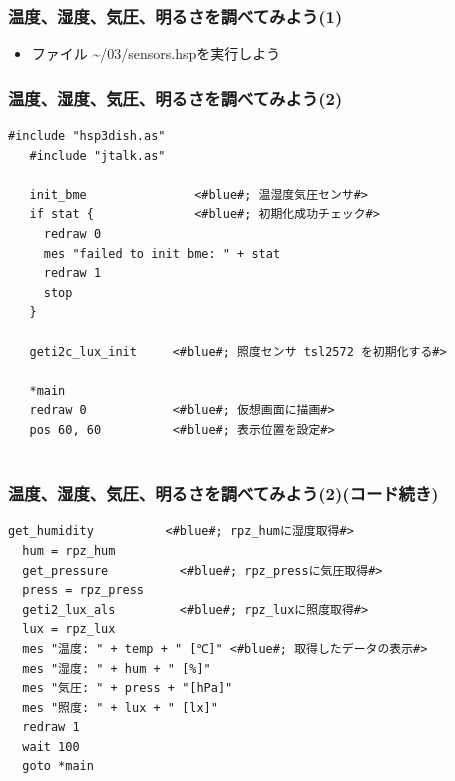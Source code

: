 

\begin{frame}
  \frametitle{温度、湿度、気圧、明るさを調べてみよう(1)}
  \begin{itemize}
    \item ファイル \rightarrow \sim/03/sensors.hspを実行しよう
  \end{itemize}
\end{frame}

\begin{frame}[fragile]
  \frametitle{温度、湿度、気圧、明るさを調べてみよう(2)}
  \begin{lstlisting}[title=sensors.hsp, label=sensors.hsp]
   #include "hsp3dish.as"    
   #include "jtalk.as"    

   init_bme               <#blue#; 温湿度気圧センサ#>
   if stat {              <#blue#; 初期化成功チェック#>
     redraw 0          
     mes "failed to init bme: " + stat
     redraw 1
     stop
   }

   geti2c_lux_init     <#blue#; 照度センサ tsl2572 を初期化する#>

   *main
   redraw 0            <#blue#; 仮想画面に描画#>
   pos 60, 60          <#blue#; 表示位置を設定#>
  
  \end{lstlisting}
\end{frame}

\begin{frame}[fragile]
  \frametitle{温度、湿度、気圧、明るさを調べてみよう(2)(コード続き)}
  \begin{lstlisting}[title=sensors.hsp, label=sensors.hsp]
  get_humidity          <#blue#; rpz_humに湿度取得#>
  hum = rpz_hum       
  get_pressure          <#blue#; rpz_pressに気圧取得#>
  press = rpz_press
  geti2_lux_als         <#blue#; rpz_luxに照度取得#>
  lux = rpz_lux
  mes "温度: " + temp + " [℃]" <#blue#; 取得したデータの表示#>
  mes "湿度: " + hum + " [%]"
  mes "気圧: " + press + "[hPa]"
  mes "照度: " + lux + " [lx]"
  redraw 1              
  wait 100
  goto *main
  \end{lstlisting}
\end{frame}


